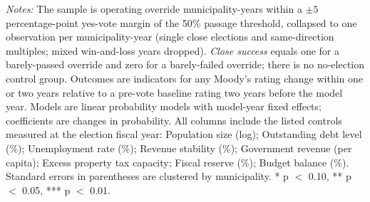 \begin{table}[!htbp]
\vspace{0.05in}
\begin{minipage}{0.96\textwidth}\footnotesize\emph{Notes:} The sample is operating override municipality-years within a $\pm 5$ percentage-point yes-vote margin of the 50\% passage threshold, collapsed to one observation per municipality-year (single close elections and same-direction multiples; mixed win-and-loss years dropped). \emph{Close success} equals one for a barely-passed override and zero for a barely-failed override; there is no no-election control group. Outcomes are indicators for any Moody's rating change within one or two years relative to a pre-vote baseline rating two years before the model year. Models are linear probability models with model-year fixed effects; coefficients are changes in probability. All columns include the listed controls measured at the election fiscal year: Population size (log); Outstanding debt level (\%); Unemployment rate (\%); Revenue stability (\%); Government revenue (per capita); Excess property tax capacity; Fiscal reserve (\%); Budget balance (\%). Standard errors in parentheses are clustered by municipality. * p $<$ 0.10, ** p $<$ 0.05, *** p $<$ 0.01.\end{minipage}
\end{table}
